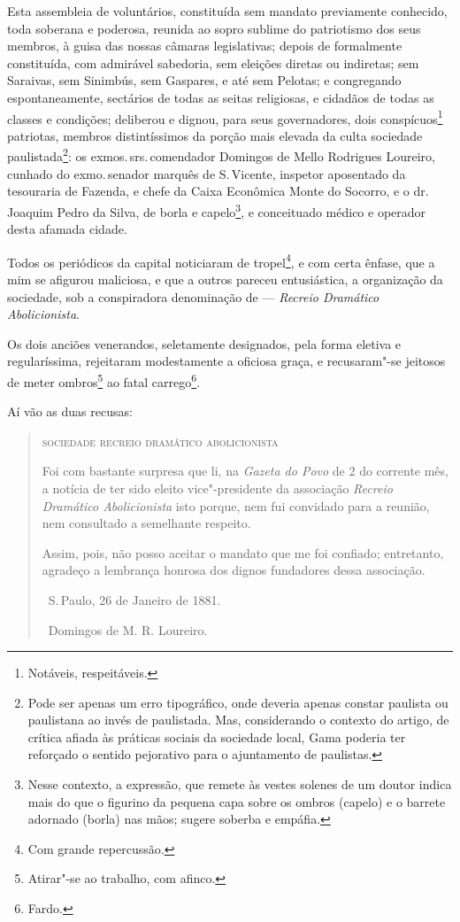 Esta assembleia de voluntários, constituída sem mandato previamente
conhecido, toda soberana e poderosa, reunida ao sopro sublime do
patriotismo dos seus membros, à guisa das nossas câmaras legislativas;
depois de formalmente constituída, com admirável sabedoria, sem eleições
diretas ou indiretas; sem Saraivas, sem Sinimbús, sem Gaspares, e até
sem Pelotas; e congregando espontaneamente, sectários de todas as seitas
religiosas, e cidadãos de todas as classes e condições; deliberou e
dignou, para seus governadores, dois conspícuos\footnote{Notáveis,
  respeitáveis.} patriotas, membros distintíssimos da porção mais
elevada da culta sociedade paulistada\footnote{Pode ser apenas um erro
  tipográfico, onde deveria apenas constar paulista ou paulistana ao
  invés de paulistada. Mas, considerando o contexto do artigo, de
  crítica afiada às práticas sociais da sociedade local, Gama poderia
  ter reforçado o sentido pejorativo para o ajuntamento de paulistas.}:
os exmos.\,srs.\,comendador Domingos de Mello Rodrigues Loureiro, cunhado
do exmo.\,senador marquês de S.\,Vicente, inspetor aposentado da
tesouraria de Fazenda, e chefe da Caixa Econômica Monte do Socorro, e o
dr.\,Joaquim Pedro da Silva, de borla e capelo\footnote{Nesse contexto, a expressão, que
  remete às vestes solenes de um doutor indica mais do
  que o figurino da pequena capa sobre os ombros (capelo) e o barrete
  adornado (borla) nas mãos; sugere soberba e empáfia.}, e conceituado
médico e operador desta afamada cidade.

Todos os periódicos da capital noticiaram de tropel\footnote{Com
  grande repercussão.}, e com certa ênfase, que a mim se afigurou
maliciosa, e que a outros pareceu entusiástica, a organização da
sociedade, sob a conspiradora denominação de --- \emph{Recreio
Dramático Abolicionista}.

Os dois anciões venerandos, seletamente designados, pela forma eletiva e
regularíssima, rejeitaram modestamente a oficiosa graça, e recusaram"-se
jeitosos de meter ombros\footnote{Atirar"-se ao trabalho, com afinco.}
ao fatal carrego\footnote{Fardo.}.

Aí vão as duas recusas:

\begin{quote}
\textsc{sociedade recreio dramático abolicionista}

Foi com bastante surpresa que li, na \emph{Gazeta do Povo} de 2 do
corrente mês, a notícia de ter sido eleito vice"-presidente da associação
\emph{Recreio Dramático Abolicionista} isto porque, nem fui convidado
para a reunião, nem consultado a semelhante respeito.

Assim, pois, não posso aceitar o mandato que me foi confiado;
entretanto, agradeço a lembrança honrosa dos dignos fundadores dessa
associação.

\hfill\ S.\,Paulo, 26 de Janeiro de 1881.

\hfill\ Domingos de M. R. Loureiro.
\end{quote}

